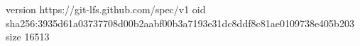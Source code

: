 version https://git-lfs.github.com/spec/v1
oid sha256:3935d61a03737708d00b2aabf00b3a7193e31dc8ddf8c81ae0109738e405b203
size 16513
